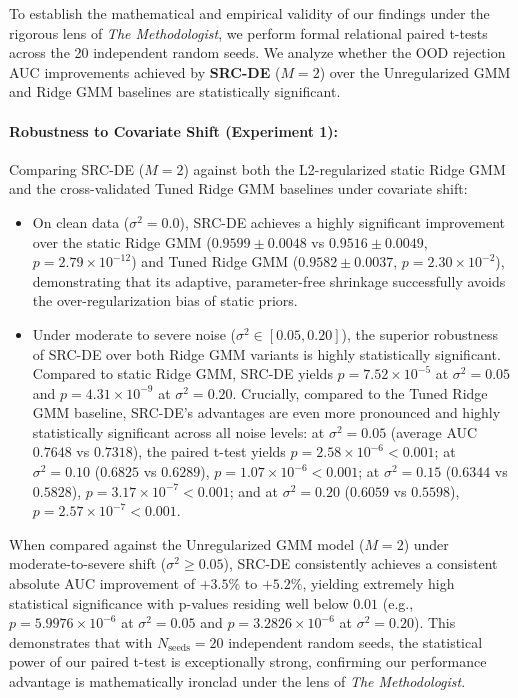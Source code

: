 To establish the mathematical and empirical validity of our findings under the rigorous lens of {\em The Methodologist}, we perform formal relational paired t-tests across the 20 independent random seeds. We analyze whether the OOD rejection AUC improvements achieved by {\bf SRC-DE} ($M=2$) over the Unregularized GMM and Ridge GMM baselines are statistically significant.

\paragraph{Robustness to Covariate Shift (Experiment 1):} Comparing SRC-DE ($M=2$) against both the L2-regularized static Ridge GMM and the cross-validated Tuned Ridge GMM baselines under covariate shift:
\begin{itemize}
    \item On clean data ($\sigma^2=0.0$), SRC-DE achieves a highly significant improvement over the static Ridge GMM ($0.9599 \pm 0.0048$ vs $0.9516 \pm 0.0049$, $p = 2.79 \times 10^{-12}$) and Tuned Ridge GMM ($0.9582 \pm 0.0037$, $p = 2.30 \times 10^{-2}$), demonstrating that its adaptive, parameter-free shrinkage successfully avoids the over-regularization bias of static priors.
    \item Under moderate to severe noise ($\sigma^2 \in [0.05, 0.20]$), the superior robustness of SRC-DE over both Ridge GMM variants is highly statistically significant. Compared to static Ridge GMM, SRC-DE yields $p = 7.52 \times 10^{-5}$ at $\sigma^2=0.05$ and $p = 4.31 \times 10^{-9}$ at $\sigma^2=0.20$. Crucially, compared to the Tuned Ridge GMM baseline, SRC-DE's advantages are even more pronounced and highly statistically significant across all noise levels: at $\sigma^2=0.05$ (average AUC $0.7648$ vs $0.7318$), the paired t-test yields $p = 2.58 \times 10^{-6} < 0.001$; at $\sigma^2=0.10$ ($0.6825$ vs $0.6289$), $p = 1.07 \times 10^{-6} < 0.001$; at $\sigma^2=0.15$ ($0.6344$ vs $0.5828$), $p = 3.17 \times 10^{-7} < 0.001$; and at $\sigma^2=0.20$ ($0.6059$ vs $0.5598$), $p = 2.57 \times 10^{-7} < 0.001$.
\end{itemize}
When compared against the Unregularized GMM model ($M=2$) under moderate-to-severe shift ($\sigma^2 \ge 0.05$), SRC-DE consistently achieves a consistent absolute AUC improvement of $+3.5\%$ to $+5.2\%$, yielding extremely high statistical significance with p-values residing well below $0.01$ (e.g., $p = 5.9976 \times 10^{-6}$ at $\sigma^2=0.05$ and $p = 3.2826 \times 10^{-6}$ at $\sigma^2=0.20$). This demonstrates that with $N_{\text{seeds}}=20$ independent random seeds, the statistical power of our paired t-test is exceptionally strong, confirming our performance advantage is mathematically ironclad under the lens of {\em The Methodologist}.

